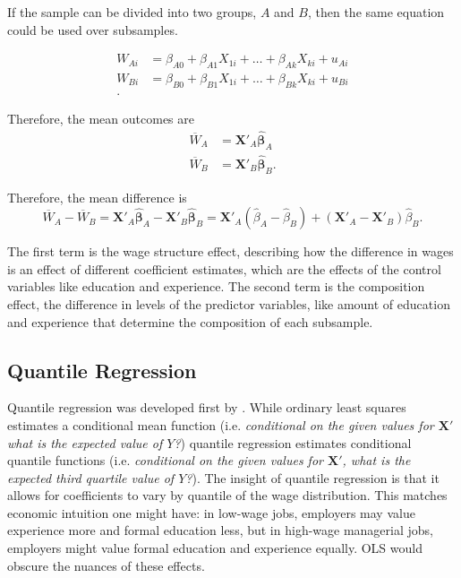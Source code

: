 \documentclass[12pt]{article}
\begin{document}
If the sample can be divided into two groups, $A$ and $B$, then the same equation could be used over subsamples.

\begin{align*}
	W_{Ai} &= \beta_{A0} + \beta_{A1}X_{1i} + \ldots +  \beta_{Ak}X_{ki} + u_{Ai} \\
	W_{Bi} &= \beta_{B0} + \beta_{B1}X_{1i} + \ldots + \beta_{Bk}X_{ki} + u_{Bi} \\
.\end{align*}

Therefore, the mean outcomes are
\begin{align*}
	\overline{W}_A &= \mathbf{X'}_{A} \mathbf{\hat{\beta}}_{A} \\
	\overline{W}_B &= \mathbf{X'}_{B} \mathbf{\hat{\beta}}_{B}
.\end{align*}

Therefore, the mean difference is
\begin{equation}
	\overline{W}_A - \overline{W}_B = \mathbf{X'}_{A} \mathbf{\hat{\beta}}_{A} - \mathbf{X'}_{B} \mathbf{\hat{\beta}}_{B} = \mathbf{X'}_{A}\left(\hat{\beta}_A - \hat{\beta}_B  \right) + \left(\mathbf{X'}_A - \mathbf{X'}_B  \right)  \hat{\beta}_B
.\end{equation}

The first term is the wage structure effect, describing how the difference in wages is an effect of different coefficient estimates, which are the effects of the control variables like education and experience. The second term is the composition effect, the difference in levels of the predictor variables, like amount of education and experience that determine the composition of each subsample.

\subsection{Quantile Regression
\label{subsec:quantile-regression}}
Quantile regression was developed first by \citet{KoenkerandBassett1978}. While ordinary least squares estimates a conditional mean function (i.e.\textit{ conditional on the given values for $\mathbf{X'}$ what is the expected value of $Y$?}) quantile regression estimates conditional quantile functions (i.e.\textit{ conditional on the given values for $\mathbf{X'}$, what is the expected third quartile value of $Y$?}). The insight of quantile regression is that it allows for coefficients to vary by quantile of the wage distribution. This matches economic intuition one might have: in low-wage jobs, employers may value experience more and formal education less, but in high-wage managerial jobs, employers might value formal education and experience equally. OLS would obscure the nuances of these effects.
\end{document}
